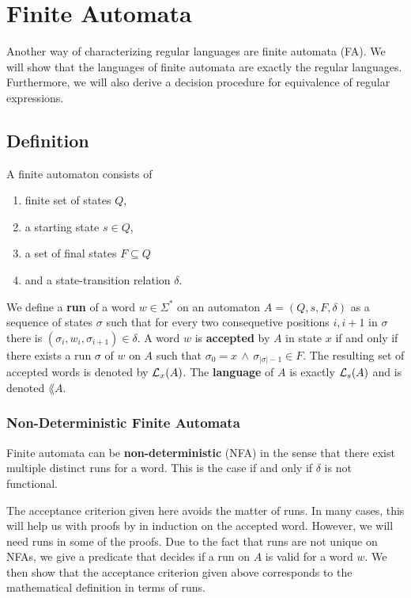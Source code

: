 
\chapter{Finite Automata}
\label{chap:FA}

Another way of characterizing regular languages are finite automata (FA)\cite{DBLP:books/daglib/0011126}. 
We will show that the languages of finite automata are exactly the regular languages. 
Furthermore, we will also derive a decision procedure for equivalence of regular expressions.

\section{Definition}
A finite automaton consists of
\begin{enumerate}
    \item
        finite set of states $Q$, 
    \item 
        a starting state $s \in Q$, 
    \item 
        a set of final states $F \subseteq Q$ 
    \item 
        and a state-transition relation $\delta$. 
\end{enumerate}

We define a \textbf{run} of a word $w \in \Sigma^*$ on an automaton $A = (Q, s, F, \delta)$ as a sequence of states $\sigma$ such that 
for every two consequetive positions $i,i+1$ in $\sigma$ there is 
$(\sigma_i, w_i, \sigma_{i+1}) \in \delta$.
A word $w$ is \textbf{accepted} by $A$ in state $x$ if and only if there exists a run $\sigma$ of $w$ on $A$ such that $\sigma_0 = x \, \wedge \, \sigma_{\vert\sigma\vert-1} \in F$.
The resulting set of accepted words is denoted by $\mathcal{L}_{x}(A)$.
The \textbf{language} of $A$ is exactly $\mathcal{L}_{s}(A)$ and is denoted $\lang{A}$. 

\subsection{Non-Deterministic Finite Automata}
Finite automata can be \textbf{non-deterministic} (NFA) in the sense that there exist multiple distinct runs for a word. 
This is the case if and only if $\delta$ is not functional.



The acceptance criterion given here avoids the matter of runs.
In many cases, this will help us with proofs by in induction on the accepted word.
However, we will need runs in some of the proofs.
Due to the fact that runs are not unique on NFAs, 
we give a predicate that decides if a run on $A$ is valid for a word $w$.
We then show that the acceptance criterion given above corresponds to the mathematical definition in terms of runs.

